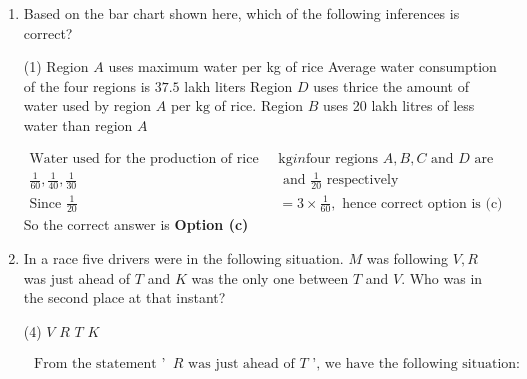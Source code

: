 \begin{enumerate}
 \begin{tasks}(4)
\end{tasks}	
\begin{answer}
	\begin{align*}
	\text{Let here be $x$ applicants}\\
\text{	From the question}\\
	x-\left(\frac{x}{4}+\frac{x}{6}+\frac{x}{8}+\frac{x}{12}\right)=18 \Rightarrow x-\frac{15 x}{24}&=18 \Rightarrow \frac{9 x}{24}=18 \Rightarrow x=48
	\end{align*}
	So the correct answer is \textbf{Option (d)}
\end{answer}
\item  Based on the bar chart shown here, which of the following inferences is correct?
 \begin{tasks}(1)
	\task[\textbf{a.}]Region $A$ uses maximum water per kg of rice
	\task[\textbf{b.}] Average water consumption of the four regions is
	$37.5$ lakh liters
	\task[\textbf{c.}] Region $D$ uses thrice the amount of water used by region $A$ per $\mathrm{kg}$ of rice.
	\task[\textbf{d.}]  Region $B$ uses 20 lakh litres of less water than region $A$
\end{tasks}	
\begin{answer}
	\begin{align*}
	 \text{Water used for the production of rice per }&\mathrm{kg} in \text{four regions $A, B, C$ and $D$ are} \\
	 \frac{1}{60}, \frac{1}{40}, \frac{1}{30}&\text{ and }\frac{1}{20}\text{ respectively}\\
	\text{Since }\frac{1}{20}&=3 \times \frac{1}{60},\text{ hence correct option is (c)}
	\end{align*}
		So the correct answer is \textbf{Option (c)}
\end{answer}
\item  In a race five drivers were in the following situation. $M$ was following $V, R$ was just ahead of $T$ and $K$ was the only one between $T$ and $V$. Who was in the second place at that instant?
	 \begin{tasks}(4)
		\task[\textbf{a.}]$V$
		\task[\textbf{b.}]$R$
		\task[\textbf{c.}]$T$
		\task[\textbf{d.}]$K$ 
	\end{tasks}
\begin{answer}
	\begin{align*}
	\text { From the statement ' } &R \text { was just ahead of } T \text { ', we have the following situation: }\\

\end{align*}
\end{answer}
\end{enumerate}
